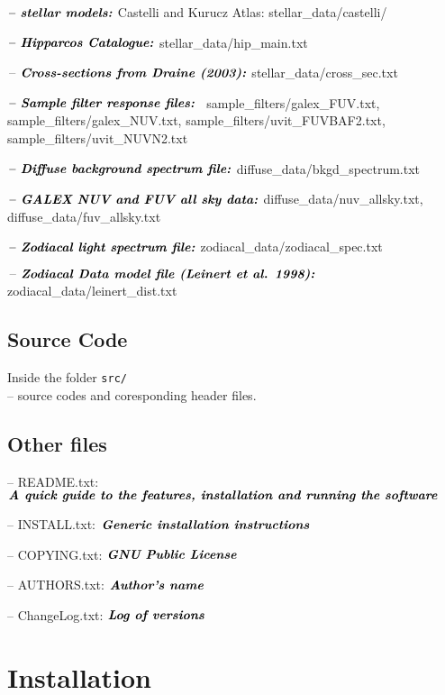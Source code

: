 \documentclass[12pt]{article}
\renewcommand{\i}{\item}
\def\i{\item}
\newcommand{\bit}[1]{\ensuremath{\textit{\bfseries{#1}}}}
\begin{document}
\begin{listing}
\item{\bit{-- stellar models:}} Castelli and Kurucz Atlas: stellar\_data/castelli/
\item{\bit{-- Hipparcos Catalogue:}} stellar\_data/hip\_main.txt
\item{\bit{-- Cross-sections from Draine (2003):}} stellar\_data/cross\_sec.txt
\item{\bit{-- Sample filter response files: }} sample\_filters/galex\_FUV.txt,
sample\_filters/galex\_NUV.txt, sample\_filters/uvit\_FUVBAF2.txt, sample\_filters/uvit\_NUVN2.txt
\item{\bit{-- Diffuse background spectrum file:}}  diffuse\_data/bkgd\_spectrum.txt
\item{\bit{-- GALEX NUV and FUV all sky data:}}  diffuse\_data/nuv\_allsky.txt,
diffuse\_data/fuv\_allsky.txt
\item{\bit{-- Zodiacal light spectrum file:}}  zodiacal\_data/zodiacal\_spec.txt
\item{\bit{-- Zodiacal Data model file (Leinert et al. 1998):}}  zodiacal\_data/leinert\_dist.txt
\end{listing}

\subsection{Source Code}



Inside the folder {\tt src/}\\
-- source codes  and coresponding header files.

\subsection{Other files}
\begin{listing}
\i -- README.txt: \bit{A quick guide to the features, installation and running the software}
\i -- INSTALL.txt:\bit{ Generic installation instructions}
\i -- COPYING.txt: \bit{GNU Public License}
\i -- AUTHORS.txt: \bit{Author's name}
\i -- ChangeLog.txt: \bit{Log of versions}
\end{listing}


\section{Installation}
\end{document}
